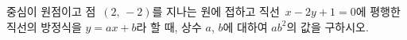 중심이 원점이고 점~$(2,\,-2)$를 지나는 원에 접하고 직선~$x-2y+1=0$에 평행한 직선의 방정식을 $y=ax+b$라 할 때, 상수 $a$, $b$에 대하여 $ab^2$의 값을 구하시오.
